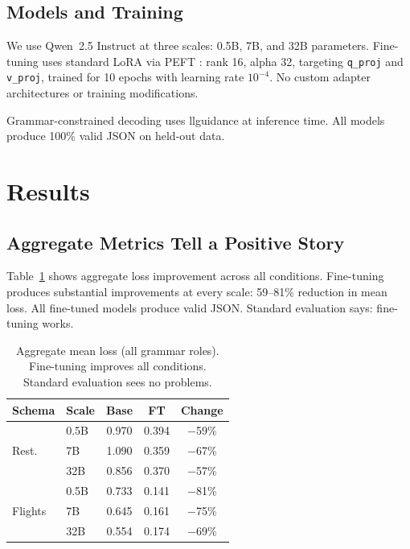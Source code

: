 \documentclass[11pt]{article}
\begin{document}
\subsection{Models and Training}

We use Qwen~2.5 Instruct at three scales: 0.5B, 7B, and 32B parameters. Fine-tuning uses standard LoRA via PEFT \cite{peft2023}: rank 16, alpha 32, targeting \texttt{q\_proj} and \texttt{v\_proj}, trained for 10 epochs with learning rate $10^{-4}$. No custom adapter architectures or training modifications.

Grammar-constrained decoding uses llguidance \cite{guidance2024} at inference time. All models produce 100\% valid JSON on held-out data.

\section{Results}

\subsection{Aggregate Metrics Tell a Positive Story}

Table~\ref{tab:aggregate} shows aggregate loss improvement across all conditions. Fine-tuning produces substantial improvements at every scale: 59--81\% reduction in mean loss. All fine-tuned models produce valid JSON. Standard evaluation says: fine-tuning works.

\begin{table}[t]
\centering
\small
\begin{tabular}{llccc}
\toprule
\textbf{Schema} & \textbf{Scale} & \textbf{Base} & \textbf{FT} & \textbf{Change} \\
\midrule
\multirow{3}{*}{Rest.} & 0.5B & 0.970 & 0.394 & $-$59\% \\
                        & 7B   & 1.090 & 0.359 & $-$67\% \\
                        & 32B  & 0.856 & 0.370 & $-$57\% \\
\midrule
\multirow{3}{*}{Flights} & 0.5B & 0.733 & 0.141 & $-$81\% \\
                          & 7B   & 0.645 & 0.161 & $-$75\% \\
                          & 32B  & 0.554 & 0.174 & $-$69\% \\
\bottomrule
\end{tabular}
\caption{Aggregate mean loss (all grammar roles). Fine-tuning improves all conditions. Standard evaluation sees no problems.}
\label{tab:aggregate}
\end{table}
\end{document}
